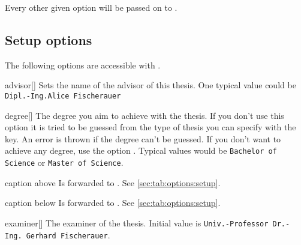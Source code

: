 \noindent
Every other given option will be passed on to .
\subsection{Setup options}\label{sec:thesis:setup}%
The following options are accessible with .
\begin{describeopt}{advisor}[]
  Sets the name of the advisor of this thesis. One typical value could be
  \texttt{Dipl.-Ing.\@ Alice Fischerauer}
\end{describeopt}
\begin{describeopt}{degree}[]
  The degree you aim to achieve with the thesis. If you don't use this option it
  is tried to be guessed from the type of thesis you can specify with the
   key. An error is thrown if the degree can't be guessed. If you
  don't want to achieve any degree, use the option . Typical
  values would be \verb|Bachelor of Science| or \verb|Master of Science|.
\end{describeopt}
\begin{describeopt}{caption above}
  Is forwarded to . See \autoref{sec:tab:options:setup}.
\end{describeopt}
\begin{describeopt}{caption below}
  Is forwarded to . See \autoref{sec:tab:options:setup}.
\end{describeopt}
\begin{describeopt}{examiner}[]
  The examiner of the thesis. Initial value is
  \texttt{Univ.-Professor Dr.-Ing.}\hskip0pt\ \texttt{Gerhard Fischerauer}.
\end{describeopt}
